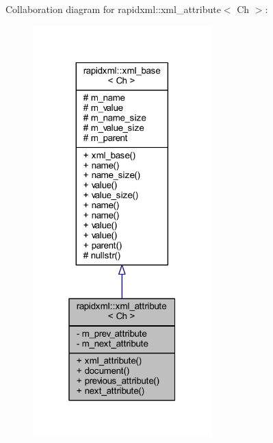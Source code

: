 Collaboration diagram for rapidxml\+:\+:xml\+\_\+attribute$<$ Ch $>$\+:\nopagebreak
\begin{figure}[H]
\begin{center}
\leavevmode
\includegraphics[width=196pt]{singletonrapidxml_1_1xml__attribute__coll__graph}
\end{center}
\end{figure}
